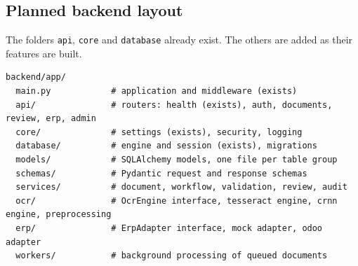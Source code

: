 \documentclass[11pt,a4paper]{report}
\begin{document}
\subsection{Planned backend layout}
The folders \texttt{api}, \texttt{core} and \texttt{database} already exist. The others are added as their features are built.
\begin{lstlisting}
backend/app/
  main.py            # application and middleware (exists)
  api/               # routers: health (exists), auth, documents, review, erp, admin
  core/              # settings (exists), security, logging
  database/          # engine and session (exists), migrations
  models/            # SQLAlchemy models, one file per table group
  schemas/           # Pydantic request and response schemas
  services/          # document, workflow, validation, review, audit
  ocr/               # OcrEngine interface, tesseract engine, crnn engine, preprocessing
  erp/               # ErpAdapter interface, mock adapter, odoo adapter
  workers/           # background processing of queued documents
\end{lstlisting}
\end{document}
